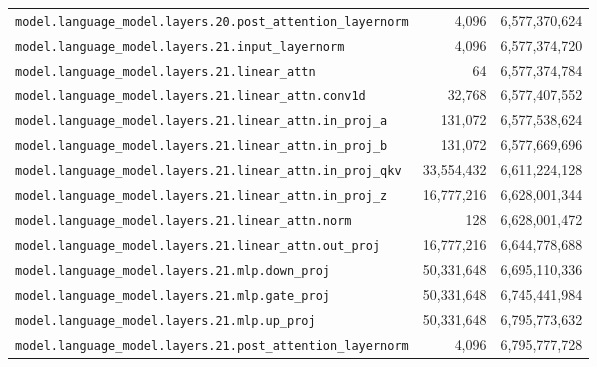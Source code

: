 \documentclass[10pt,a4paper]{article}
\theoremstyle{definition}
\begin{document}
\begin{appendices}
\begin{longtable}{p{9.5cm}rr}
\texttt{model.\allowbreak{}language\_model.\allowbreak{}layers.\allowbreak{}20.\allowbreak{}post\_attention\_layernorm} & 4,096 & 6,577,370,624 \\
\texttt{model.\allowbreak{}language\_model.\allowbreak{}layers.\allowbreak{}21.\allowbreak{}input\_layernorm} & 4,096 & 6,577,374,720 \\
\texttt{model.\allowbreak{}language\_model.\allowbreak{}layers.\allowbreak{}21.\allowbreak{}linear\_attn} & 64 & 6,577,374,784 \\
\texttt{model.\allowbreak{}language\_model.\allowbreak{}layers.\allowbreak{}21.\allowbreak{}linear\_attn.\allowbreak{}conv1d} & 32,768 & 6,577,407,552 \\
\texttt{model.\allowbreak{}language\_model.\allowbreak{}layers.\allowbreak{}21.\allowbreak{}linear\_attn.\allowbreak{}in\_proj\_a} & 131,072 & 6,577,538,624 \\
\texttt{model.\allowbreak{}language\_model.\allowbreak{}layers.\allowbreak{}21.\allowbreak{}linear\_attn.\allowbreak{}in\_proj\_b} & 131,072 & 6,577,669,696 \\
\texttt{model.\allowbreak{}language\_model.\allowbreak{}layers.\allowbreak{}21.\allowbreak{}linear\_attn.\allowbreak{}in\_proj\_qkv} & 33,554,432 & 6,611,224,128 \\
\texttt{model.\allowbreak{}language\_model.\allowbreak{}layers.\allowbreak{}21.\allowbreak{}linear\_attn.\allowbreak{}in\_proj\_z} & 16,777,216 & 6,628,001,344 \\
\texttt{model.\allowbreak{}language\_model.\allowbreak{}layers.\allowbreak{}21.\allowbreak{}linear\_attn.\allowbreak{}norm} & 128 & 6,628,001,472 \\
\texttt{model.\allowbreak{}language\_model.\allowbreak{}layers.\allowbreak{}21.\allowbreak{}linear\_attn.\allowbreak{}out\_proj} & 16,777,216 & 6,644,778,688 \\
\texttt{model.\allowbreak{}language\_model.\allowbreak{}layers.\allowbreak{}21.\allowbreak{}mlp.\allowbreak{}down\_proj} & 50,331,648 & 6,695,110,336 \\
\texttt{model.\allowbreak{}language\_model.\allowbreak{}layers.\allowbreak{}21.\allowbreak{}mlp.\allowbreak{}gate\_proj} & 50,331,648 & 6,745,441,984 \\
\texttt{model.\allowbreak{}language\_model.\allowbreak{}layers.\allowbreak{}21.\allowbreak{}mlp.\allowbreak{}up\_proj} & 50,331,648 & 6,795,773,632 \\
\texttt{model.\allowbreak{}language\_model.\allowbreak{}layers.\allowbreak{}21.\allowbreak{}post\_attention\_layernorm} & 4,096 & 6,795,777,728 \\

\end{longtable}
\end{appendices}
\end{document}
